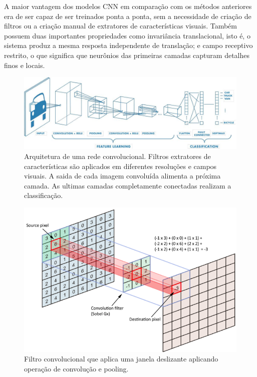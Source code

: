 A maior vantagem dos modelos CNN em comparação com os métodos anteriores era de ser capaz de ser treinados ponta a ponta, sem a necessidade de criação de filtros ou a criação manual de extratores de características visuais. Também possuem duas importantes propriedades como invariância translacional, isto é, o sistema produz a mesma resposta independente de translação; e campo receptivo restrito, o que significa que neurônios das primeiras camadas capturam detalhes finos e locais.
\begin{figure}[!ht]
    \centering
    \includegraphics[width=0.95\columnwidth]{
        Imagens/CNN_mathworks.jpg
    }
    \caption{Arquitetura de uma rede convolucional. Filtros extratores de características são aplicados em diferentes resoluções e campos visuais. A saida de cada imagem convoluída alimenta a próxima camada. As ultimas camadas completamente conectadas realizam a classificação.}
    \label{fig:cnn}
\end{figure}

\begin{figure}[!ht]
    \centering
    \includegraphics[width=0.6\columnwidth]{
        Imagens/operacao_conv.png
    }
    \caption{
 Filtro convolucional que aplica uma janela deslizante aplicando operação de convolução e pooling.  
    }
    \label{fig:conv}
\end{figure}






